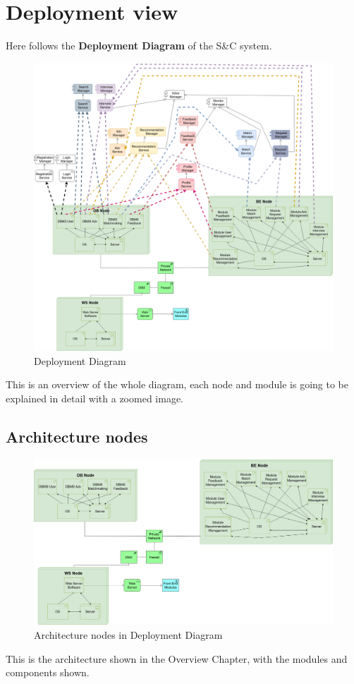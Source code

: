 \section{Deployment view}
Here follows the \textbf{Deployment Diagram} of the S\&C system.
\begin{figure}[H]
    \centering
    \includegraphics[width=15cm]{images/architectural design/deployment/DD-deploymentdiagram2.drawio.png}
    \caption{Deployment Diagram}
\end{figure}
This is an overview of the whole diagram, each node and module is going to be explained in detail with a zoomed image.
\subsection{Architecture nodes}
\begin{figure}[H]
    \centering
    \includegraphics[width=15cm]{images/architectural design/deployment/depl-rete.drawio (1).png}
    \caption{Architecture nodes in Deployment Diagram}
\end{figure}
This is the architecture shown in the Overview Chapter, with the modules and components shown.
